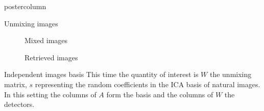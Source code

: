 \documentclass{beamer}
\begin{document}
\begin{frame}
\begin{columns}
\begin{column}{.5\textwidth}
\begin{beamercolorbox}[center]{postercolumn}
\begin{minipage}{.98\textwidth}
{\begin{myblock}{Unmixing images}
\begin{figure}[H]
						  \hfill
						  \caption{Mixed images}
						\end{figure}
						\begin{figure}[H]
						  \centering
						  \hfill
						  \hfill
						  \caption{Retrieved images}
						\end{figure}
					\end{myblock}\vfill
					\begin{myblock}{Independent images basis}
						This time the quantity of interest is $W$ the unmixing matrix, $s$ representing the random coefficients in the ICA basis of natural images. In this setting the columns of $A$ form the basis and the columns of $W$ the detectors.
						\begin{figure}[H]
							\centering

\end{figure}
\end{myblock}}
\end{minipage}
\end{beamercolorbox}
\end{column}
\end{columns}
\end{frame}
\end{document}
